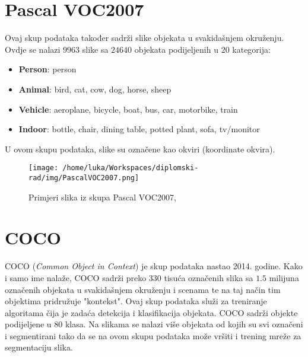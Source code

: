 \section{Pascal VOC2007}

Ovaj skup podataka \citep{pascal-voc-2007} također sadrži slike objekata u svakidašnjem okruženju. Ovdje se nalazi $9963$ slike sa $24 640$ objekata podijeljenih u $20$ kategorija:
\begin{itemize}
	\item \textbf{Person}: person
    \item \textbf{Animal}: bird, cat, cow, dog, horse, sheep
    \item \textbf{Vehicle}: aeroplane, bicycle, boat, bus, car, motorbike, train
    \item \textbf{Indoor}: bottle, chair, dining table, potted plant, sofa, tv/monitor
\end{itemize}
U ovom skupu podataka, slike su označene kao okviri (koordinate okvira).

\begin{figure}[h]
	\centering
	\texttt{[image: /home/luka/Workspaces/diplomski-rad/img/PascalVOC2007.png]}
	\caption{Primjeri slika iz skupa Pascal VOC2007, \citep{pascal-voc-2007}}
	\label{img:pascalVOC2007}
\end{figure}

\section{COCO}

COCO (\textit{Common Object in Context}) \citep{coco} je skup podataka nastao 2014. godine. Kako i samo ime nalaže, COCO sadrži preko $330$ tisuća označenih slika sa $1.5$ milijuna označenih objekata u svakidašnjem okruženju i scenama te na taj način tim objektima pridružuje "kontekst". Ovaj skup podataka služi za treniranje algoritama čija je zadaća detekcija i klasifikacija objekata. COCO sadrži objekte podijeljene u $80$ klasa. Na slikama se nalazi više objekata od kojih su svi označeni i segmentirani tako da se na ovom skupu podataka može vršiti i trening mreže za segmentaciju slika. 

